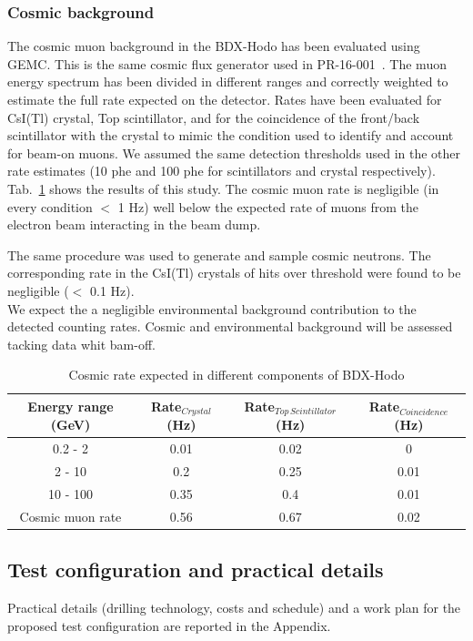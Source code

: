 \subsubsection{Cosmic background}
The cosmic muon background in the BDX-Hodo has been evaluated using GEMC. This is the same cosmic flux generator used in PR-16-001~\cite{bdx-proposal}. The muon energy spectrum has been divided in different ranges  and correctly weighted to estimate the full rate expected on the detector. Rates have been evaluated for CsI(Tl) crystal, Top scintillator,  and for the coincidence of the front/back scintillator with the crystal  to mimic the condition used to identify and account for beam-on muons. We assumed the same detection thresholds used in the other rate estimates (10 phe and 100 phe for scintillators and crystal respectively). Tab.~\ref{tab:cosmic} shows the results of this study. The cosmic muon  rate is negligible (in every condition $<$ 1 Hz) well below the expected rate of muons from the electron beam interacting in the beam dump.

The same procedure was used to generate and sample cosmic neutrons. The corresponding rate in the CsI(Tl) crystals of hits over threshold  were found to be negligible ($<$ 0.1 Hz).
\\

We expect the a negligible  environmental background contribution to the detected counting rates.  Cosmic and environmental background will be assessed tacking data whit bam-off.

\begin{table}[htp]
\caption{Cosmic rate expected in different components of BDX-Hodo}
\begin{center}
\begin{tabular}{|c|c|c|c|}
\hline
Energy range  (GeV) & Rate$_{Crystal}$  (Hz)&  Rate$_{Top\,Scintillator} $(Hz) & Rate$_{Coincidence}$ (Hz) \\
\hline\hline
 0.2 - 2  & 0.01 &  0.02 & 0\\
 \hline
 2 - 10  & 0.2 &  0.25 & 0.01\\
 \hline
 10 - 100  & 0.35 &  0.4 & 0.01\\
\hline\hline
Cosmic muon rate  & 0.56 &  0.67 & 0.02 \\
\hline\hline
\end{tabular}
\end{center}
\label{tab:cosmic}
\end{table}%

\subsection{Test configuration and practical details}
Practical details (drilling technology, costs and schedule) and a work plan for the proposed test configuration  are reported in the Appendix.

